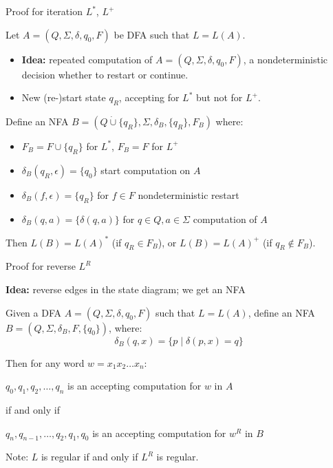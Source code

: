 \documentclass[handout]{beamer}
\begin{document}
\begin{frame}{Proof for iteration $L^*$, $L^+$}

    Let $A=(Q,\Sigma, \delta,q_0,F)$ be DFA such that $L=L(A)$. 
    \begin{itemize}
        \item \textbf{Idea:} repeated computation of $A=(Q,\Sigma, \delta,q_0,F)$, a nondeterministic decision whether to restart or continue.
        \item New (re-)start state $q_R$, accepting for $L^*$ but not for $L^+$.
    \end{itemize}
       
    Define an NFA $B=(Q\mathbin{\dot\cup}\{q_R\},\Sigma,\delta_B,\{q_R\},F_B)$ where:
    \begin{itemize}
        \item $F_B=F\cup\{q_R\}$ for $L^*$, $F_B=F$ for $L^+$
        \item $\delta_B(q_R,\epsilon)=\{q_0\}$ \hfill start computation on $A$
        \item $\delta_B(f,\epsilon)=\{q_R\}$ for $f\in F$ \hfill nondeterministic restart
        \item $\delta_B(q,a)=\{\delta(q,a)\}$ for $q\in Q,a\in \Sigma$ \hfill computation of $A$
    \end{itemize}

    Then $L(B)=L(A)^*$ (if $q_R\in F_B$), or $L(B)=L(A)^+$ (if $q_R\notin F_B$).
    
    \hfill\qedsymbol

\end{frame}
    

\begin{frame}{Proof for reverse $L^R$}

    \textbf{Idea:} reverse edges in the state diagram; we get an NFA

    Given a DFA  $A=(Q,\Sigma, \delta,q_0,F)$ such that $L=L(A)$, define an NFA $B=(Q,\Sigma,\delta_B,F,\{q_0\})$, where:
    $$
        \delta_B(q,x)=\{p\mid \delta(p,x)=q\}
    $$

    Then for any word $w=x_1x_2\ldots x_n$:
    
    \begin{center}
        $q_0,q_1,q_2,\ldots, q_n$ is an accepting computation for $w$ in $A$   

        if and only if

        $q_n,q_{n-1},\ldots,q_2,q_1,q_0$ is an accepting computation for $w^R$ in $B$
    \end{center}
    \hfill\qedsymbol

    Note: $L$ is regular \alert{if and only if} $L^R$ is regular.

\end{frame}
\end{document}
